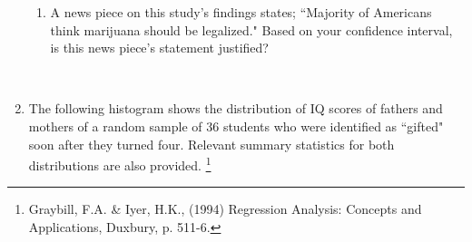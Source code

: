 \documentclass[11pt]{article}
\newcommand{\soln}[2]{$\:$\\ \vspace{#1}}{}
\begin{document}
\begin{enumerate}
\begin{enumerate}
\item A news piece on this study's findings states; ``Majority of Americans think marijuana should be legalized." 
Based on your confidence interval, is this news piece's statement justified? 

\soln{2cm}{No, the interval contains 50\%, suggesting that the true population proportion could be just 50\% or even lower. 
Using this interval we wouldn't reject a null hypothesis where $p = 0.50$.}

\end{enumerate}


\pagebreak

\item The following histogram shows the distribution of IQ scores of fathers and mothers of a random sample of 36 
students who were identified as ``gifted" soon after they turned four. Relevant summary statistics for both 
distributions are also provided.
\footnote{Graybill, F.A. \& Iyer, H.K., (1994) Regression Analysis: Concepts and Applications, Duxbury, p. 511-6.}


\end{enumerate}
\end{document}
